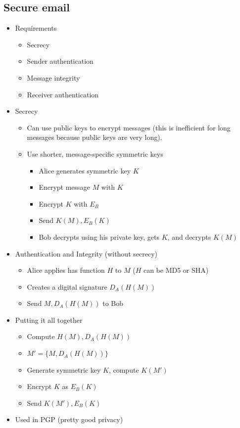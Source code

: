 \documentclass[twoside]{article}
\begin{document}
\subsection{Secure email}

\begin{itemize}
\item Requirements

\begin{itemize}
\item Secrecy
\item Sender authentication
\item Message integrity
\item Receiver authentication
\end{itemize}

\item Secrecy

\begin{itemize}
\item Can use public keys to encrypt messages (this is inefficient for long messages because public keys are very long).
\item Use shorter, message-specific symmetric keys

\begin{itemize}
\item Alice generates symmetric key $K$
\item Encrypt message $M$ with $K$
\item Encrypt $K$ with $E_B$
\item Send $K(M), E_B(K)$
\item Bob decrypts using his private key, gets $K$, and decrypts $K(M)$
\end{itemize}

\end{itemize}

\item Authentication and Integrity (without secrecy)

\begin{itemize}
\item Alice applies has function $H$ to $M$ ($H$ can be MD5 or SHA)
\item Creates a digital signature $D_A(H(M))$ 
\item Send $M, D_A(H(M))$ to Bob
\end{itemize}

\item Putting it all together

\begin{itemize}
\item Compute $H(M), D_A(H(M))$
\item $M' = \{M, D_A(H(M)) \}$
\item Generate symmetric key $K$, compute $K(M')$
\item Encrypt $K$ as $E_B(K)$
\item Send $K(M'), E_B(K)$
\end{itemize}

\item Used in PGP (pretty good privacy)

\end{itemize}
\end{document}
